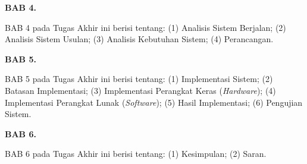 \textbf{BAB 4. \babEmpat}

BAB 4 pada Tugas Akhir ini berisi tentang: (1) Analisis Sistem Berjalan; (2) Analisis Sistem Usulan; (3) Analisis Kebutuhan Sistem; (4) Perancangan.

\textbf{BAB 5. \babLima}

BAB 5 pada Tugas Akhir ini berisi tentang: (1) Implementasi Sistem; (2) Batasan Implementasi; (3) Implementasi Perangkat Keras (\textit{Hardware}); (4) Implementasi Perangkat Lunak (\textit{Software}); (5) Hasil Implementasi; (6) Pengujian Sistem.

\textbf{BAB 6. \babEnam}

BAB 6 pada Tugas Akhir ini berisi tentang: (1) Kesimpulan; (2) Saran.
